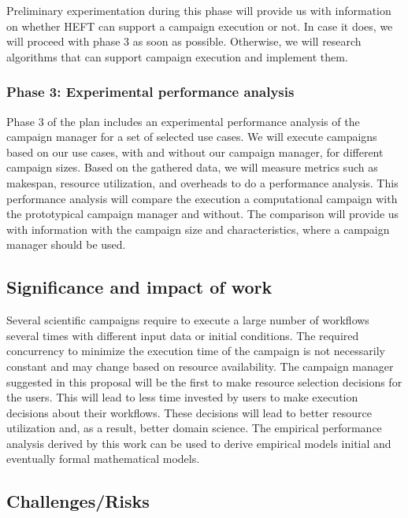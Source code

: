 Preliminary experimentation during this phase will provide us with information on whether HEFT can support a campaign execution or not.
In case it does, we will proceed with phase 3 as soon as possible.
Otherwise, we will research algorithms that can support campaign execution and implement them.

\subsubsection{Phase 3: Experimental performance analysis}
\label{obj3}
Phase 3 of the plan includes an experimental performance analysis of the campaign manager for a set of selected use cases.
We will execute campaigns based on our use cases, with and without our campaign manager, for different campaign sizes.
Based on the gathered data, we will measure metrics such as makespan, resource utilization, and overheads to do a performance analysis.
This performance analysis will compare the execution a computational campaign with the prototypical campaign manager and without.
The comparison will provide us with information with the campaign size and characteristics, where a campaign manager should be used.

\subsection{Significance and impact of work}
Several scientific campaigns require to execute a large number of workflows several times with different input data or initial conditions. 
The required concurrency to minimize the execution time of the campaign is not necessarily constant and may change based on resource availability. 
The campaign manager suggested in this proposal will be the first to make resource selection decisions for the users. 
This will lead to less time invested by users to make execution decisions about their workflows. 
These decisions will lead to better resource utilization and, as a result, better domain science. 
The empirical performance analysis derived by this work can be used to derive empirical models initial and eventually formal mathematical models.

\subsection{Challenges/Risks}

